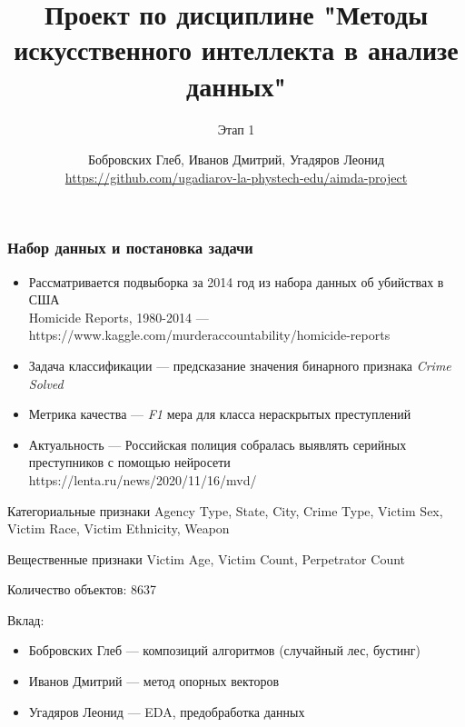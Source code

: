 \documentclass[aspectratio=169,8pt]{beamer}
\title[Проект по дисциплине МИИАД] {Проект по дисциплине "Методы искусственного интеллекта в анализе данных"}
\subtitle{Этап 1}
\author[Бобровских, Иванов, Угадяров] {Бобровских Глеб, Иванов Дмитрий, Угадяров Леонид \\ \tiny\url{https://github.com/ugadiarov-la-phystech-edu/aimda-project}}
\institute{Группа 4}
\begin{document}
\begin{frame}
\titlepage
\end{frame}

\begin{frame}
\frametitle{Набор данных и постановка задачи}

\begin{itemize}
\item { Рассматривается подвыборка за 2014 год из набора данных об убийствах в США \\ Homicide Reports, 1980-2014 --- https://www.kaggle.com/murderaccountability/homicide-reports }
\item Задача классификации --- предсказание значения бинарного признака \emph {Crime Solved}
\item Метрика качества --- \emph {F1} мера для класса нераскрытых преступлений
\item {Актуальность --- Российская полиция собралась выявлять серийных преступников с помощью нейросети \\ https://lenta.ru/news/2020/11/16/mvd/ }
\end{itemize}

\begin{block}{Категориальные признаки}
Agency Type, State, City, Crime Type, Victim Sex, Victim Race, Victim Ethnicity, Weapon
\end{block}

\begin{block}{Вещественные признаки}
Victim Age, Victim Count, Perpetrator Count
\end{block}

Количество объектов: 8637 \newline

Вклад:
\begin{itemize}
\item Бобровских Глеб --- композиций алгоритмов (случайный лес, бустинг)
\item Иванов Дмитрий --- метод опорных векторов
\item Угадяров Леонид --- EDA, предобработка данных
\end{itemize}

\end{frame}
\end{document}
